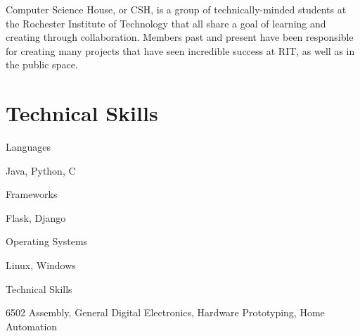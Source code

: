 \documentclass[margin,line]{resume}
\begin{document}
\begin{resume}
\begin{asparablank}
        \small Computer Science House, or CSH, is a group of technically-minded students at the Rochester Institute of Technology that all share a goal of learning and creating through collaboration. Members past and present have been responsible for creating many projects that have seen incredible success at RIT, as well as in the public space.
	\end{asparablank}

    
\section{\mysidestyle Technical Skills}
	\begin{compactdesc}
		\item[Languages] \begin{inparaenum} { \small
			Java, Python, C
		} \end{inparaenum}
        \item[Frameworks] \begin{inparaenum} { \small
        	Flask, Django
        } \end{inparaenum}
		\item[Operating Systems] \begin{inparaenum} { \small
			Linux, Windows
		} \end{inparaenum}
        \item[Technical Skills] \begin{inparaenum} { \small
			6502 Assembly, General Digital Electronics, Hardware Prototyping, Home Automation
        } \end{inparaenum}
        \normalsize
	\end{compactdesc}

\end{resume}
\end{document}
